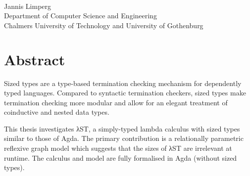 
\thispagestyle{plain}			%

\begingroup
\setlength{\parindent}{0pt}

\oneLineTitle\\
Jannis Limperg\\
Department of Computer Science and Engineering\\
Chalmers University of Technology and University of Gothenburg

\endgroup

\section*{Abstract}

Sized types are a type-based termination checking mechanism for dependently
typed languages. Compared to syntactic termination checkers, sized types make
termination checking more modular and allow for an elegant treatment of
coinductive and nested data types.

This thesis investigates λST, a simply-typed lambda calculus with sized types
similar to those of Agda. The primary contribution is a relationally parametric
reflexive graph model which suggests that the sizes of λST are irrelevant at
runtime. The calculus and model are fully formalised in Agda (without sized
types).




\newpage				%
\thispagestyle{empty}
\mbox{}